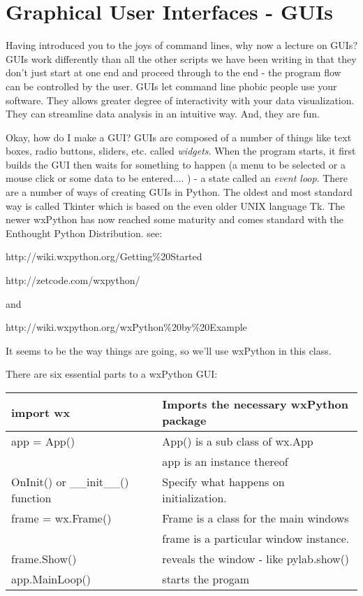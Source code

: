 {%



\section{Graphical User Interfaces - GUIs}

 Having introduced you to the joys of command lines, why now a lecture on GUIs?  
 GUIs work differently than all the other scripts we have been writing in that they don't just start at one end and proceed through to the end - the program flow can be controlled by the user.
GUIs let command line phobic people use your software.
They allows greater degree of interactivity with your data visualization.
They can streamline data analysis in an intuitive way.
And, they are fun.



Okay, how do I make  a GUI? 
 GUIs are composed of a number of things like text boxes, radio buttons, sliders, etc. called {\it widgets}.
 When the program starts, it first builds the GUI then waits for something to happen  (a menu to be selected or a mouse click or some data to be entered.... ) - a state called an {\it event loop}.  
There are a number of ways of creating GUIs in Python.  The oldest and most standard way is called {\color{blue}Tkinter} which is based on the even older UNIX language Tk.  
The newer {\color{blue}wxPython} has now reached some maturity and comes standard with the Enthought Python Distribution. see:


http://wiki.wxpython.org/Getting\%20Started

http://zetcode.com/wxpython/

and

http://wiki.wxpython.org/wxPython\%20by\%20Example

 It seems to be the way things are going, so we'll use wxPython in this class.







There are six essential parts to a wxPython GUI:

{\begin{tabular}{|l|l|}
\hline
import wx &Imports the necessary wxPython package\\
\hline
app = App()     &App() is a sub class of  wx.App \\
&app is an instance thereof\\
\hline
OnInit()  or  \_\_init\_\_()  function        &Specify what happens on initialization.\\
\hline
frame = wx.Frame()         &Frame is a class for the main windows\\
&frame is a particular window instance.\\
\hline
frame.Show()    &reveals the window - like pylab.show()\\
\hline
app.MainLoop()   &starts the progam\\
\hline
\end{tabular}

}}

